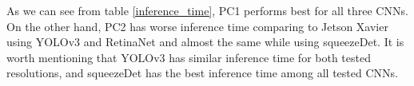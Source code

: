 \documentclass[twoside]{ctuthesis}
\theoremstyle{plain}
\theoremstyle{definition}
\theoremstyle{note}
\begin{document}
\begin{table}[H]
        \centering
        \caption{PC1 technical specification}
        \label{malaria-tech-spec}
\end{table}
\begin{table}[H]
        \centering
        \caption{PC2 technical specification}
        \label{my-tech-spec}
\end{table}

As we can see from table \ref{inference_time}, PC1 performs best for all three CNNs. On the other hand, PC2 has worse inference time comparing to Jetson Xavier using YOLOv3 and RetinaNet and almost the same while using squeezeDet. It is worth mentioning that YOLOv3 has similar inference time for both tested resolutions, and squeezeDet has the best inference time among all tested CNNs.
\end{document}
